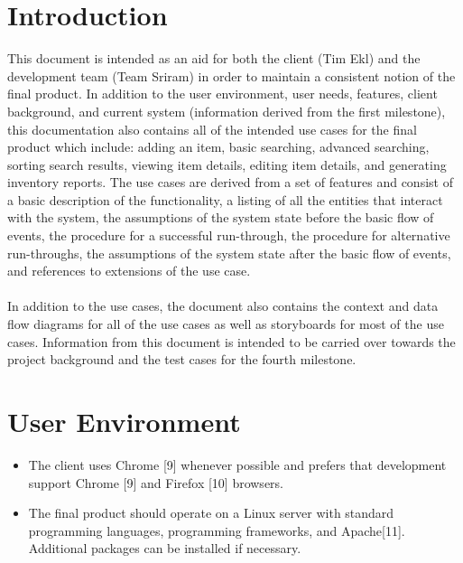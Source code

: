 \documentclass{article}
\begin{document}
\section{Introduction}
This document is intended as an aid for both the client (Tim Ekl) and the development team (Team Sriram) in order to maintain a consistent notion of the final product.  In addition to the user environment, user needs, features, client background, and current system (information derived from the first milestone), this documentation also contains all of the intended use cases for the final product which include:  adding an item, basic searching, advanced searching, sorting search results, viewing item details, editing item details, and generating inventory reports.  The use cases are derived from a set of features and consist of a basic description of the functionality, a listing of all the entities that interact with the system, the assumptions of the system state before the basic flow of events, the procedure for a successful run-through, the procedure for alternative run-throughs, the assumptions of the system state after the basic flow of events, and references to extensions of the use case.\\
~\\
In addition to the use cases, the document also contains the context and data flow diagrams for all of the use cases as well as storyboards for most of the use cases.  Information from this document is intended to be carried over towards the project background and the test cases for the fourth milestone.

\section{User Environment}
\begin{itemize}
\item The client uses Chrome [9] whenever possible and prefers that development support Chrome [9] and Firefox [10] browsers.
\item The final product should operate on a Linux server with standard programming languages, programming frameworks, and Apache[11].  Additional packages can be installed if necessary.
\end{itemize}
\end{document}

